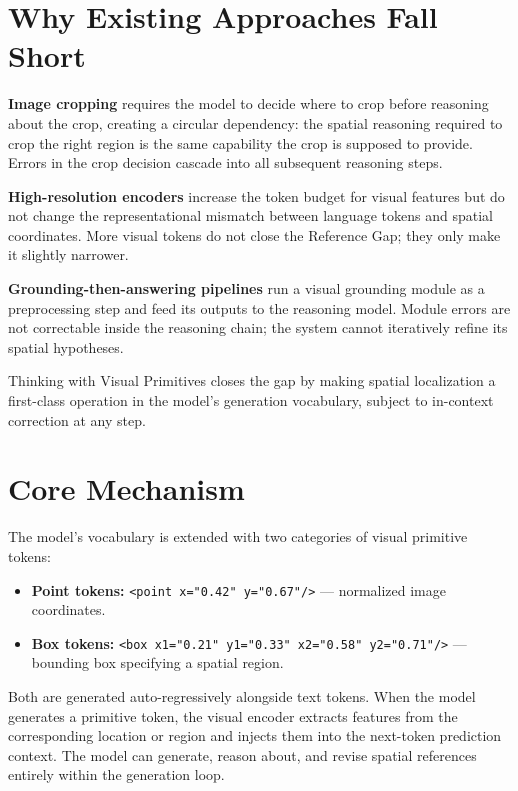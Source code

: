 \documentclass[10pt,twocolumn]{article}
\begin{document}
\section{Why Existing Approaches Fall Short}

\textbf{Image cropping} requires the model to decide where to crop before reasoning about the crop, creating a circular dependency: the spatial reasoning required to crop the right region is the same capability the crop is supposed to provide.
Errors in the crop decision cascade into all subsequent reasoning steps.

\textbf{High-resolution encoders} increase the token budget for visual features but do not change the representational mismatch between language tokens and spatial coordinates.
More visual tokens do not close the Reference Gap; they only make it slightly narrower.

\textbf{Grounding-then-answering pipelines} run a visual grounding module as a preprocessing step and feed its outputs to the reasoning model.
Module errors are not correctable inside the reasoning chain; the system cannot iteratively refine its spatial hypotheses.

Thinking with Visual Primitives closes the gap by making spatial localization a first-class operation in the model's generation vocabulary, subject to in-context correction at any step.

\section{Core Mechanism}

The model's vocabulary is extended with two categories of visual primitive tokens:

\begin{itemize}[leftmargin=1em,itemsep=2pt]
  \item \textbf{Point tokens:} \texttt{<point x="0.42" y="0.67"/>} --- normalized image coordinates.
  \item \textbf{Box tokens:} \texttt{<box x1="0.21" y1="0.33" x2="0.58" y2="0.71"/>} --- bounding box specifying a spatial region.
\end{itemize}

Both are generated auto-regressively alongside text tokens.
When the model generates a primitive token, the visual encoder extracts features from the corresponding location or region and injects them into the next-token prediction context.
The model can generate, reason about, and revise spatial references entirely within the generation loop.
\end{document}

